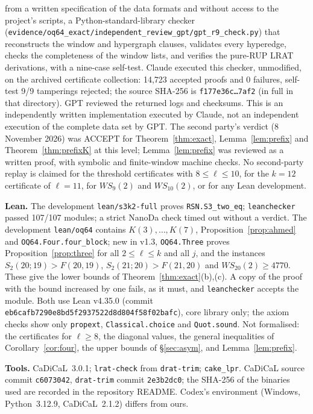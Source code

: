 \documentclass[11pt]{amsart}
\theoremstyle{definition}
\newcommand{\F}{F}
\newcommand{\Stwo}{S_2}
\begin{document}
from a written specification of the data formats and without access to the project's scripts, a Python-standard-library checker (\texttt{evidence/oq64\_exact/independent\_review\_gpt/gpt\_r9\_check.py}) that reconstructs the window and hypergraph clauses, validates every hyperedge, checks the completeness of the window lists, and verifies the pure-RUP LRAT derivations, with a nine-case self-test. Claude executed this checker, unmodified, on the archived certificate collection: 14{,}723 accepted proofs and 0 failures, self-test 9/9 tamperings rejected; the source SHA-256 is \texttt{f177e36c\ldots7af2} (in full in that directory). GPT reviewed the returned logs and checksums. This is an independently written implementation executed by Claude, not an independent execution of the complete data set by GPT. The second party's verdict (8 November 2026) was ACCEPT for Theorem~\ref{thm:exact}, Lemma~\ref{lem:prefix} and Theorem~\ref{thm:prefixK} at this level; Lemma~\ref{lem:prefix} was reviewed as a written proof, with symbolic and finite-window machine checks. No second-party replay is claimed for the threshold certificates with $8\le\ell\le10$, for the $k=12$ certificate of $\ell=11$, for $WS_9(2)$ and $WS_{10}(2)$, or for any Lean development.


\smallskip\noindent\textbf{Lean.} The development \texttt{lean/s3k2-full} proves \texttt{RSN.S3\_two\_eq}; \texttt{leanchecker} passed 107/107 modules; a strict NanoDa check timed out without a verdict. The development \texttt{lean/oq64} contains $K(3),\dots,K(7)$, Proposition~\ref{prop:ahmed} and \texttt{OQ64.Four.four\_block}; new in v1.3, \texttt{OQ64.Three} proves Proposition~\ref{prop:three} for all $2\le\ell\le k$ and all $j$, and the instances $\Stwo(20;19)>\F(20,19)$, $\Stwo(21;20)>\F(21,20)$ and $WS_{20}(2)\ge4770$. These give the lower bounds of Theorem~\ref{thm:exact}(b),(c). A copy of the proof with the bound increased by one fails, as it must, and \texttt{leanchecker} accepts the module. Both use Lean v4.35.0 (commit \texttt{eb6cafb7290e8bd5f2937522d8d804f58f02bafc}), core library only; the axiom checks show only \texttt{propext}, \texttt{Classical.choice} and \texttt{Quot.sound}. Not formalised: the certificates for $\ell\ge8$, the diagonal values, the general inequalities of Corollary~\ref{cor:four}, the upper bounds of \S\ref{sec:asym}, and Lemma~\ref{lem:prefix}.


\smallskip\noindent\textbf{Tools.} CaDiCaL~3.0.1; \texttt{lrat-check} from \texttt{drat-trim}; \texttt{cake\_lpr}. CaDiCaL source commit \texttt{c6073042}, \texttt{drat-trim} commit \texttt{2e3b2dc0}; the SHA-256 of the binaries used are recorded in the repository README. Codex's environment (Windows, Python~3.12.9, CaDiCaL~2.1.2) differs from ours.
\end{document}
